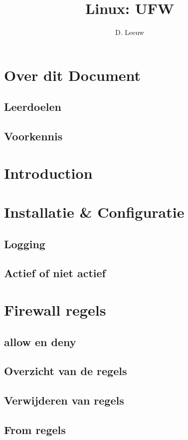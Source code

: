 \documentclass[a4paper,12pt,twoside,openright,titlepage]{article}
\author{D. Leeuw}
\title{Linux: UFW}
\date{\today\\
\vfill
\raggedright
\copyright\ 2026 Dennis Leeuw\\
}
\begin{document}

\maketitle


\section{Over dit Document}
\subsection{Leerdoelen}

\subsection{Voorkennis}





\section{Introduction}


\section{Installatie \& Configuratie}


\subsection{Logging}

\subsection{Actief of niet actief}


\section{Firewall regels}

\subsection{allow en deny}

\subsection{Overzicht van de regels}

\subsection{Verwijderen van regels}

\subsection{From regels}



\printindex
\end{document}
